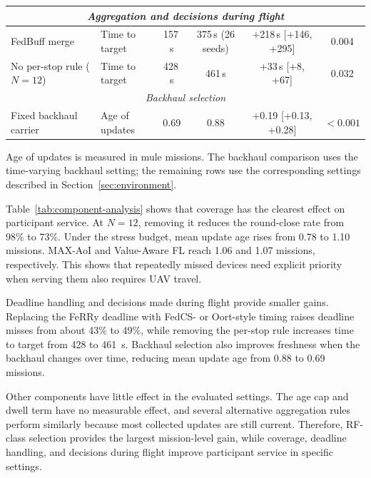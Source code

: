 \documentclass[conference]{IEEEtran}
\newcommand{\sysname}{FeRRy}
\begin{document}
\begin{table}[h]
\begin{tabular}{
p{}
p{}
c
c
c
c
}
\hline
\multicolumn{6}{c}{\textit{Aggregation and decisions during flight}} \\
\hline

FedBuff merge &
Time to target &
157\,s & 375\,s (26 seeds) &
+218\,s [+146, +295] &
0.004 \\

No per-stop rule (\(N=12\)) &
Time to target &
428\,s & 461\,s &
+33\,s [+8, +67] &
0.032 \\

\hline
\multicolumn{6}{c}{\textit{Backhaul selection}} \\
\hline

Fixed backhaul carrier &
Age of updates &
0.69 & 0.88 &
+0.19 [+0.13, +0.28] &
$<0.001$ \\

\hline
\end{tabular}

\vspace{2pt}
\footnotesize
Age of updates is measured in mule missions. The backhaul comparison uses the
time-varying backhaul setting; the remaining rows use the corresponding
settings described in Section~\ref{sec:environment}.
\end{table}

Table~\ref{tab:component-analysis} shows that coverage has the clearest
effect on participant service. At \(N=12\), removing it reduces the round-close
rate from 98\% to 73\%. Under the stress budget, mean update age rises from
0.78 to 1.10 missions. MAX-AoI and Value-Aware FL reach 1.06 and 1.07 missions,
respectively. This shows that repeatedly missed devices need explicit priority
when serving them also requires UAV travel.

Deadline handling and decisions made during flight provide smaller gains.
Replacing the \sysname{} deadline with FedCS- or Oort-style timing raises
deadline misses from about 43\% to 49\%, while removing the per-stop rule
increases time to target from 428 to 461~s. Backhaul selection also improves
freshness when the backhaul changes over time, reducing mean update age from
0.88 to 0.69 missions.

Other components have little effect in the evaluated settings. The age cap and
dwell term have no measurable effect, and several alternative aggregation rules
perform similarly because most collected updates are still current. Therefore,
RF-class selection provides the largest mission-level gain, while coverage,
deadline handling, and decisions during flight improve participant service in
specific settings.
\end{document}
